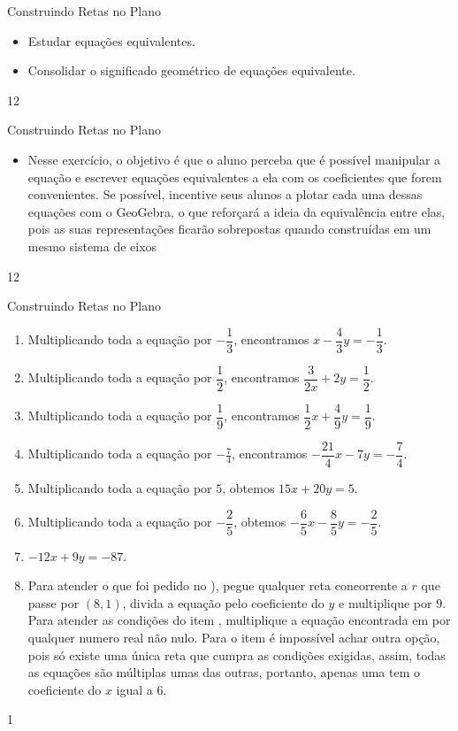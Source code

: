 \clearpage
\def\currentcolor{session2}
\begin{objectives}{Construindo Retas no Plano}
{
\begin{itemize}
\item Estudar equações equivalentes.
\item Consolidar o significado geométrico de equações equivalente. 
\end{itemize}
}{1}{2}
\end{objectives}
\begin{sugestions}{Construindo Retas no Plano}
{
\begin{itemize}
\item Nesse exercício, o objetivo é que o aluno perceba que é possível manipular a equação e escrever equações equivalentes a ela com os coeficientes que forem convenientes. Se possível, incentive seus alunos a plotar cada uma dessas equações com o GeoGebra, o que reforçará a ideia da equivalência entre elas, pois as suas representações ficarão sobrepostas quando construídas em um mesmo sistema de eixos
\end{itemize}
}{1}{2}
\end{sugestions}
\begin{answer}{Construindo Retas no Plano}
{
\begin{enumerate}
\item Multiplicando toda a equação por $-\dfrac{1}{3}$, encontramos $x-\dfrac{4}{3}y = -\dfrac{1}{3}$.
\item Multiplicando toda a equação por $\dfrac{1}{2}$, encontramos $\dfrac{3}{2x} + 2y =\dfrac{1}{2}$.
\item Multiplicando toda a equação por $\dfrac{1}{9}$, encontramos $\dfrac{1}{2}x + \dfrac{4}{9}y = \dfrac{1}{9}$.
\item Multiplicando toda a equação por $-\frac{7}{4}$, encontramos $-\dfrac{21}{4}x - 7y = - \dfrac{7}{4}$.
\item Multiplicando toda a equação por $5$, obtemos $15x + 20y = 5$.
\item Multiplicando toda a equação por $-\dfrac{2}{5}$, obtemos $-\dfrac{6}{5}x - \dfrac{8}{5}y = -\dfrac{2}{5}$.
\item $-12x+9y=-87$.
\item Para atender o que foi pedido no ), pegue qualquer reta concorrente a $r$ que passe por $(8,1)$, divida a equação pelo coeficiente do $y$ e multiplique por $9$. Para atender as condições do item , multiplique a equação encontrada em  por qualquer numero real não nulo. Para o item  é impossível achar outra opção, pois só existe uma única reta que cumpra as condições exigidas, assim, todas as equações são múltiplas umas das outras, portanto, apenas uma tem o coeficiente do $x$ igual a $6$.
\end{enumerate}
}{1}
\end{answer}

